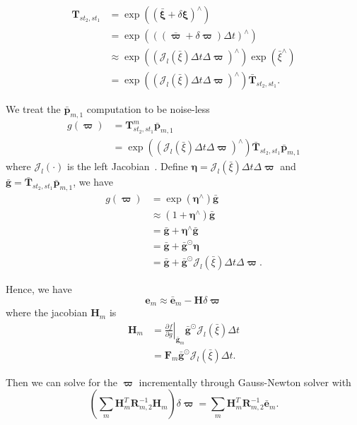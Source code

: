 \begin{equation}
\begin{split}
    \mathbf{T}_{st_2, st_1} &= \exp{((\bar{\bm{\xi}}+\delta \bm{\xi})^{\wedge})}  \\
    &= \exp{((( \bar{\bm{\varpi}}+\delta \bm{\varpi}) \Delta t)^{\wedge})}  \\
    & \approx \exp{((\mathcal{J}_{l}(\bar{\xi})\Delta t \Delta \bm{\varpi})^{\wedge})} \exp{(\bar{\xi}^{\wedge})} \\
    & = \exp{((\mathcal{J}_{l}(\bar{\xi})\Delta t \Delta \bm{\varpi})^{\wedge})} \bar{\mathbf{T}}_{st_2,st_1}.
\end{split}
\end{equation}

We treat the $\bar{\mathbf{p}}_{m,1}$ computation to be noise-less
\begin{equation}
\begin{split}
    g(\bm{\varpi}) &= \mathbf{T}_{st_2, st_1}^{m} \bar{\mathbf{p}}_{m,1}  \\
    &= \exp{((\mathcal{J}_{l}(\bar{\xi})\Delta t \Delta \bm{\varpi})^{\wedge})} \bar{\mathbf{T}}_{st_2,st_1} \bar{\mathbf{p}}_{m,1}
\end{split}
\end{equation}
where $\mathcal{J}_{l}(\cdot)$ is the left Jacobian~\cite{barfoot2024state}.
Define $\bm{\eta} = \mathcal{J}_{l}(\bar{\xi})\Delta t \Delta \bm{\varpi}$ and $\bar{\mathbf{g}} = \bar{\mathbf{T}}_{st_2,st_1} \bar{\mathbf{p}}_{m,1}$, we have 
\begin{equation}
    \begin{split}
    g(\bm{\varpi}) &= \exp{(\bm{\eta}^{\wedge})} \bar{\mathbf{g}} \\
    & \approx (1+\bm{\eta}^{\wedge}) \bar{\mathbf{g}}  \\
    &= \bar{\mathbf{g}} + \bm{\eta}^{\wedge} \bar{\mathbf{g}}   \\
    &= \bar{\mathbf{g}} + \bar{\mathbf{g}}^{\odot} \bm{\eta}    \\
    &= \bar{\mathbf{g}} + \bar{\mathbf{g}}^{\odot} \mathcal{J}_{l}(\bar{\xi})\Delta t \Delta \bm{\varpi}.
    \end{split}
\end{equation}

Hence, we have 
\begin{equation}
        \mathbf{e}_m \approx \bar{\mathbf{e}}_m - \mathbf{H}\delta \bm{\varpi}
\end{equation}
where the jacobian $\mathbf{H}_m$ is
\begin{equation}
\begin{split}
    \mathbf{H}_m &= \left.\frac{\partial f}{\partial g}\right|_{\bar{\mathbf g}_m}  \bar{\mathbf{g}}^{\odot} \mathcal{J}_{l}(\bar{\xi})\Delta t  \\
    &=\mathbf{F}_m \bar{\mathbf{g}}^{\odot} \mathcal{J}_{l}(\bar{\xi})\Delta t.
\end{split}
\end{equation}

Then we can solve for the $\bm{\varpi}$ incrementally through Gauss-Newton solver with
\begin{equation}
    \left(\sum_{m} \mathbf{H}^T_m \mathbf{R}_{m,2}^{-1}\mathbf{H}_m\right)\delta \bm{\varpi} = \sum_{m} \mathbf{H}_m^{T} \mathbf{R}_{m,2}^{-1} \bar{\mathbf{e}}_m.
\end{equation}


